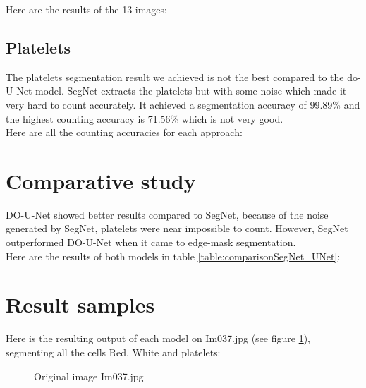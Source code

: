 Here are the results of the 13 images:



\subsection{Platelets}
\hspace{\parindent}
The platelets segmentation result we achieved is not the best compared to the do-U-Net model. SegNet extracts the platelets but with some noise which made it very hard to count accurately.
It achieved a segmentation accuracy of 99.89\% and the highest counting accuracy is 71.56\% which is not very good.\\
Here are all the counting accuracies for each approach:



\section{Comparative study}
DO-U-Net showed better results compared to SegNet, because of the noise generated by SegNet, platelets were near impossible to count.
However, SegNet outperformed DO-U-Net when it came to edge-mask segmentation.\\
Here are the results of both models in table \ref{table:comparisonSegNet_UNet}:

\vspace{0.2in}



\section{Result samples}
\vspace{0.2in}
\hspace{\parindent}
Here is the resulting output of each model on Im037.jpg (see figure \ref{fig:originalImage}), segmenting all the cells Red, White and platelets:

\begin{figure}[H]
  \centering
  \vspace{0.1in}
  \caption{Original image Im037.jpg}
  \label{fig:originalImage}
\end{figure}

